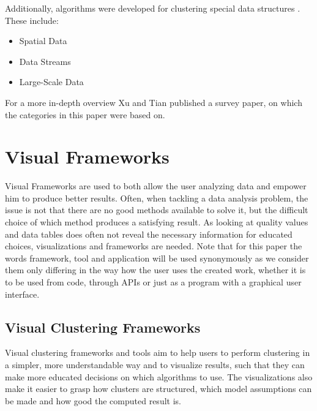 \documentclass[
	a4paper,
	english,
	twoside,
	openright,               
	11pt                            
	]{report}
\begin{document}
Additionally, algorithms were developed for clustering special data structures \cite{surveyclustering}. These include:

\begin{itemize}
  \item Spatial Data
  \item Data Streams
  \item Large-Scale Data
\end{itemize}

For a more in-depth overview Xu and Tian \cite{surveyclustering} published a survey paper, on which the categories in this paper were based on.

\section{Visual Frameworks}
Visual Frameworks are used to both allow the user analyzing data and empower him to produce better results. Often, when tackling a data analysis problem, the issue is not that there are no good methods available to solve it, but the difficult choice of which method produces a satisfying result. As looking at quality values and data tables does often not reveal the necessary information for educated choices, visualizations and frameworks are needed. Note that for this paper the words framework, tool and application will be used synonymously as we consider them only differing in the way how the user uses the created work, whether it is to be used from code, through APIs or just as a program with a graphical user interface.

\subsection{Visual Clustering Frameworks}
Visual clustering frameworks and tools aim to help users to perform clustering in a simpler, more understandable way and to visualize results, such that they can make more educated decisions on which algorithms to use. The visualizations also make it easier to grasp how clusters are structured, which model assumptions can be made and how good the computed result is.
\end{document}
